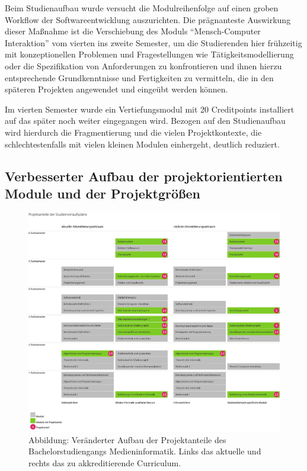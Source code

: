 Beim Studienaufbau wurde versucht die Modulreihenfolge auf einen groben
Workflow der Softwareentwicklung auszurichten. Die prägnanteste
Auswirkung dieser Maßnahme ist die Verschiebung des Moduls
``Mensch-Computer Interaktion'' vom vierten ins zweite Semester, um die
Studierenden hier frühzeitig mit konzeptionellen Problemen und
Fragestellungen wie Tätigkeitsmodellierung oder die Spezifikation von
Anforderungen zu konfrontieren und ihnen hierzu entsprechende
Grundkenntnisse und Fertigkeiten zu vermitteln, die in den späteren
Projekten angewendet und eingeübt werden können.

Im vierten Semester wurde ein Vertiefungsmodul mit 20 Creditpoints
installiert auf das später noch weiter eingegangen wird. Bezogen auf den
Studienaufbau wird hierdurch die Fragmentierung und die vielen
Projektkontexte, die schlechtestenfalls mit vielen kleinen Modulen
einhergeht, deutlich reduziert.

\subsection{Verbesserter Aufbau der projektorientierten Module und
der
Projektgrößen}\label{verbesserter-aufbau-der-projektorientierten-module-und-der-projektgruxf6uxdfen}

\begin{figure}[htbp]
\centering
\includegraphics[width=\columnwidth]{../anhaenge/bilder/ba-projektanteile.pdf}
\caption{Abbildung: Veränderter Aufbau der Projektanteile des
Bachelorstudiengangs Medieninformatik. Links das aktuelle und rechts das
zu akkreditierende Curriculum.}
\end{figure}

